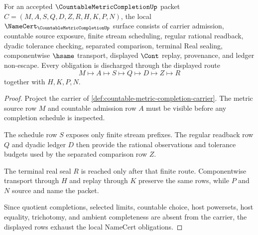\begin{theorem}
\label{thm:countable-metric-completion-namecert-obligations}
For an accepted $\CountableMetricCompletionUp$ packet $C=(M,A,S,Q,D,Z,R,H,K,P,N)$, the local $\NameCert_{\CountableMetricCompletionUp}$ surface consists of carrier admission, countable source exposure, finite stream scheduling, regular rational readback, dyadic tolerance checking, separated comparison, terminal Real sealing, componentwise $\hsame$ transport, displayed $\Cont$ replay, provenance, and ledger non-escape. Every obligation is discharged through the displayed route
$$
M\longmapsto A\longmapsto S\longmapsto Q\longmapsto D\longmapsto Z\longmapsto R
$$
together with $H,K,P,N$.
\end{theorem}
\begin{proof}
Project the carrier of \autoref{def:countable-metric-completion-carrier}. The metric source row $M$ and countable admission row $A$ must be visible before any completion schedule is inspected.

The schedule row $S$ exposes only finite stream prefixes. The regular readback row $Q$ and dyadic ledger $D$ then provide the rational observations and tolerance budgets used by the separated comparison row $Z$.

The terminal real seal $R$ is reached only after that finite route. Componentwise transport through $H$ and replay through $K$ preserve the same rows, while $P$ and $N$ source and name the packet.

Since quotient completions, selected limits, countable choice, host powersets, host equality, trichotomy, and ambient completeness are absent from the carrier, the displayed rows exhaust the local NameCert obligations.
\end{proof}

